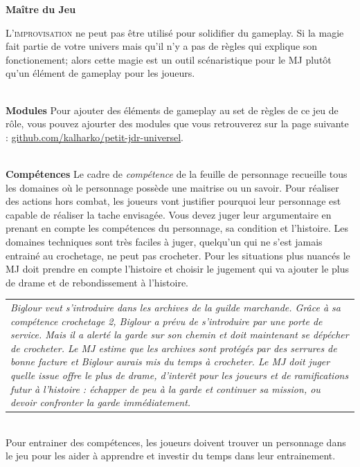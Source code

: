 \documentclass[11pt]{article} %
\newcommand{\enluminure}[2]{\lettrine[lines=3]{\small \initfamily #1}{#2}}
\newcommand{\myjump}[1][1]{\mbox{}\\[#1cm]}
\begin{document}
\newpage
\textbf{\huge Maître du Jeu}

\enluminure{L}{'improvisation} ne peut pas être utilisé pour solidifier du gameplay. Si la magie fait partie de votre univers mais qu'il n'y a pas de règles qui explique son fonctionement; alors cette magie est un outil scénaristique pour le MJ plutôt qu'un élément de gameplay pour les joueurs.

\myjump[0]
\textbf{Modules}\newline
\noindent Pour ajouter des éléments de gameplay au set de règles de ce jeu de rôle, vous pouvez ajourter des modules que vous retrouverez sur la page suivante : \href{https://github.com/kalharko/petit-jdr-universel}{github.com/kalharko/petit-jdr-universel}.




\myjump[0]
\textbf{Compétences}\newline
Le cadre de \emph{compétence} de la feuille de personnage recueille tous les domaines où le personnage possède une maitrise ou un savoir. Pour réaliser des actions hors combat, les joueurs vont justifier pourquoi leur personnage est capable de réaliser la tache envisagée. Vous devez juger leur argumentaire en prenant en compte les compétences du personnage, sa condition et l'histoire. Les domaines techniques sont très faciles à juger, quelqu'un qui ne s'est jamais entrainé au crochetage, ne peut pas crocheter. Pour les situations plus nuancés le MJ doit prendre en compte l'histoire et choisir le jugement qui va ajouter le plus de drame et de rebondissement à l'histoire.\newline\newline
\begin{tabularx}{\linewidth}{|X}
\emph{Biglour veut s'introduire dans les archives de la guilde marchande. Grâce à sa compétence crochetage 2, Biglour a prévu de s'introduire par une porte de service. Mais il a alerté la garde sur son chemin et doit maintenant se dépécher de crocheter. Le MJ estime que les archives sont protégés par des serrures de bonne facture et Biglour aurais mis du temps à crocheter. Le MJ doit juger quelle issue offre le plus de drame, d'interêt pour les joueurs et de ramifications futur à l'histoire : échapper de peu à la garde et continuer sa mission, ou devoir confronter la garde immédiatement. }\\
\end{tabularx}
\myjump[0.35]
Pour entrainer des compétences, les joueurs doivent trouver un personnage dans le jeu pour les aider à apprendre et investir du temps dans leur entrainement.
\end{document}
